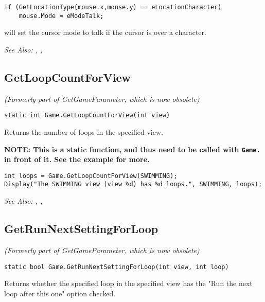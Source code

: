 \begin{verbatim}
if (GetLocationType(mouse.x,mouse.y) == eLocationCharacter)
    mouse.Mode = eModeTalk;
\end{verbatim}
will set the cursor mode to talk if the cursor is over a character.

\it{See Also:} ,
,


\subsection{GetLoopCountForView}\label{Game.GetLoopCountForView}%

\it{(Formerly part of GetGameParameter, which is now obsolete)}

\begin{verbatim}
static int Game.GetLoopCountForView(int view)
\end{verbatim}
Returns the number of loops in the specified view.

\bf{NOTE:} This is a static function, and thus need to be called with \verb$Game.$ in front of it. See
the example for more.

\begin{verbatim}
int loops = Game.GetLoopCountForView(SWIMMING);
Display("The SWIMMING view (view %d) has %d loops.", SWIMMING, loops);
\end{verbatim}

\it{See Also:} ,
,


\subsection{GetRunNextSettingForLoop}\label{Game.GetRunNextSettingForLoop}%

\it{(Formerly part of GetGameParameter, which is now obsolete)}

\begin{verbatim}
static bool Game.GetRunNextSettingForLoop(int view, int loop)
\end{verbatim}
Returns whether the specified loop in the specified view has the "Run the next loop after this one" option checked.

